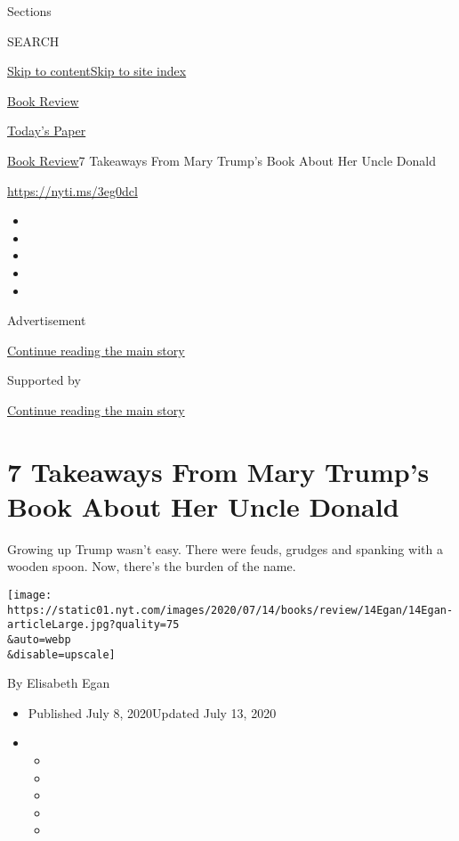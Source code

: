 Sections

SEARCH

\protect\hyperlink{site-content}{Skip to
content}\protect\hyperlink{site-index}{Skip to site index}

\href{https://www.nytimes.com/section/books/review}{Book Review}

\href{https://myaccount.nytimes.com/auth/login?response_type=cookie\&client_id=vi}{}

\href{https://www.nytimes.com/section/todayspaper}{Today's Paper}

\href{/section/books/review}{Book Review}\textbar{}7 Takeaways From Mary
Trump's Book About Her Uncle Donald

\url{https://nyti.ms/3eg0dcl}

\begin{itemize}
\item
\item
\item
\item
\item
\end{itemize}

Advertisement

\protect\hyperlink{after-top}{Continue reading the main story}

Supported by

\protect\hyperlink{after-sponsor}{Continue reading the main story}

\hypertarget{7-takeaways-from-mary-trumps-book-about-her-uncle-donald}{%
\section{7 Takeaways From Mary Trump's Book About Her Uncle
Donald}\label{7-takeaways-from-mary-trumps-book-about-her-uncle-donald}}

Growing up Trump wasn't easy. There were feuds, grudges and spanking
with a wooden spoon. Now, there's the burden of the name.

\texttt{[image: https://static01.nyt.com/images/2020/07/14/books/review/14Egan/14Egan-articleLarge.jpg?quality=75\\\&auto=webp\\\&disable=upscale]}

By Elisabeth Egan

\begin{itemize}
\item
  Published July 8, 2020Updated July 13, 2020
\item
  \begin{itemize}
  \item
  \item
  \item
  \item
  \item
  \end{itemize}
\end{itemize}


